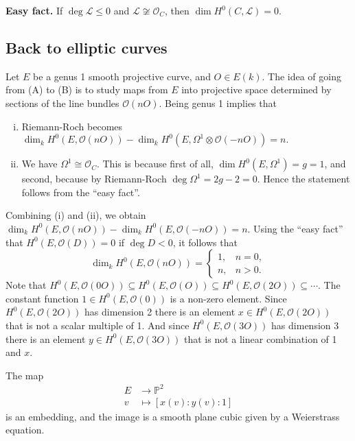 \textbf{Easy fact.}  If \( \operatorname{deg} \mathcal{L} \leq 0 \) and \( \mathcal{L} \not\cong \mathcal{O}_C \), then \( \operatorname{dim} H^0 \left( C,\mathcal{L} \right) = 0 \).

\subsection{Back to elliptic curves}
Let \( E \) be a genus 1 smooth projective curve, and \( O \in E(k) \).
The idea of going from (A) to (B) is to study maps from \( E \) into projective space determined by sections of the line bundles \( \mathcal{O}(nO) \).
Being genus 1 implies that
\begin{enumerate}[(i)]
\item Riemann-Roch becomes \( \operatorname{dim}_k H^0 \left( E, \mathcal{O}(nO) \right) - \operatorname{dim}_k H^0 \left( E, \Omega^1 \otimes \mathcal{O}(-nO)  \right) = n .  \)
\item We have \( \Omega^1 \cong \mathcal{O}_C \).  This is because first of all, \( \operatorname{dim} H^0 \left( E, \Omega^1 \right) = g = 1 \), and second, because by Riemann-Roch \( \operatorname{deg} \Omega^1 = 2g - 2 = 0 \). Hence the statement follows from the ``easy fact''.
\end{enumerate}
Combining (i) and (ii), we obtain
\( \operatorname{dim}_k H^0 \left( E, \mathcal{O}(nO) \right) - \operatorname{dim}_k H^0 \left( E, \mathcal{O}(-nO) \right) = n . \)
Using the ``easy fact'' that \( H^0 \left( E, \mathcal{O}(D) \right) = 0 \) if \( \operatorname{deg} D < 0 \), it follows that
\[ \operatorname{dim}_k H^0 \left( E, \mathcal{O}(nO) \right) =
  \begin{cases}
    1, & n = 0, \\
    n, & n > 0 .
  \end{cases}
\]
Note that \( H^0 \left( E, \mathcal{O}(0 O) \right) \subseteq H^0 \left( E, \mathcal{O}(O) \right) \subseteq H^0 \left( E, \mathcal{O}(2O) \right) \subseteq \cdots \).
The constant function \( 1 \in H^0 \left( E, \mathcal{O}(0) \right) \) is a non-zero element.
Since \( H^0 \left( E, \mathcal{O}(2O) \right) \) has dimension 2 there is an element \( x \in H^0 \left( E, \mathcal{O}(2O) \right) \) that is not a scalar multiple of 1.
And since \( H^0 \left( E, \mathcal{O}(3O) \right)  \) has dimension 3 there is an element \( y \in H^0 \left( E, \mathcal{O}(3O) \right) \) that is not a linear combination of 1 and \( x \).

\begin{claim}
  \label{res:E-is-cubic-claim}
  The map
\begin{align*}
  E & \to \mathbb{P}^2 \\
  v & \mapsto \left[ x(v) : y(v) : 1 \right]
\end{align*}
is an embedding, and the image is a smooth plane cubic given by a Weierstrass equation.
\end{claim}

